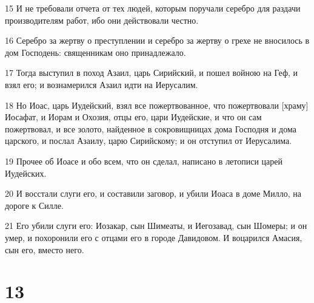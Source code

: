 \par 15 И не требовали отчета от тех людей, которым поручали серебро для раздачи производителям работ, ибо они действовали честно.
\par 16 Серебро за жертву о преступлении и серебро за жертву о грехе не вносилось в дом Господень: священникам оно принадлежало.
\par 17 Тогда выступил в поход Азаил, царь Сирийский, и пошел войною на Геф, и взял его; и вознамерился Азаил идти на Иерусалим.
\par 18 Но Иоас, царь Иудейский, взял все пожертвованное, что пожертвовали [храму] Иосафат, и Иорам и Охозия, отцы его, цари Иудейские, и что он сам пожертвовал, и все золото, найденное в сокровищницах дома Господня и дома царского, и послал Азаилу, царю Сирийскому; и он отступил от Иерусалима.
\par 19 Прочее об Иоасе и обо всем, что он сделал, написано в летописи царей Иудейских.
\par 20 И восстали слуги его, и составили заговор, и убили Иоаса в доме Милло, на дороге к Силле.
\par 21 Его убили слуги его: Иозакар, сын Шимеаты, и Иегозавад, сын Шомеры; и он умер, и похоронили его с отцами его в городе Давидовом. И воцарился Амасия, сын его, вместо него.

\chapter{13}

